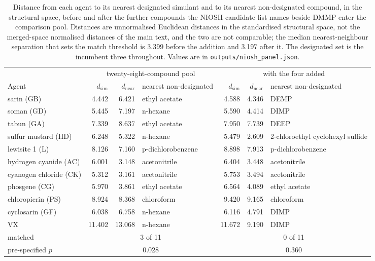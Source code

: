 \begin{table}[htb]
\centering
\caption{Distance from each agent to its nearest designated simulant and to its nearest non-designated compound, in the structural space, before and after the further compounds the NIOSH candidate list names beside DMMP enter the comparison pool. Distances are unnormalised Euclidean distances in the standardised structural space, not the merged-space normalised distances of the main text, and the two are not comparable; the median nearest-neighbour separation that sets the match threshold is 3.399 before the addition and 3.197 after it. The designated set is the incumbent three throughout. Values are in \texttt{outputs/niosh\_panel.json}.}
\label{tab:niosh}
\footnotesize
\setlength{\tabcolsep}{3pt}
\begin{tabular}{lrrlrrl}
\hline
 & \multicolumn{3}{c}{twenty-eight-compound pool} & \multicolumn{3}{c}{with the four added} \\
\cline{2-4}\cline{5-7}
Agent & $d_{\mathrm{sim}}$ & $d_{\mathrm{near}}$ & nearest non-designated & $d_{\mathrm{sim}}$ & $d_{\mathrm{near}}$ & nearest non-designated \\
\hline
sarin (GB) & 4.442 & 6.421 & ethyl acetate & 4.588 & 4.346 & DEMP \\
soman (GD) & 5.445 & 7.197 & n-hexane & 5.590 & 4.414 & DIMP \\
tabun (GA) & 7.339 & 8.637 & ethyl acetate & 7.950 & 7.739 & DEEP \\
sulfur mustard (HD) & 6.248 & 5.322 & n-hexane & 5.479 & 2.609 & 2-chloroethyl cyclohexyl sulfide \\
lewisite 1 (L) & 8.126 & 7.160 & p-dichlorobenzene & 8.898 & 7.913 & p-dichlorobenzene \\
hydrogen cyanide (AC) & 6.001 & 3.148 & acetonitrile & 6.404 & 3.448 & acetonitrile \\
cyanogen chloride (CK) & 5.312 & 3.161 & acetonitrile & 5.753 & 3.494 & acetonitrile \\
phosgene (CG) & 5.970 & 3.861 & ethyl acetate & 6.564 & 4.089 & ethyl acetate \\
chloropicrin (PS) & 8.924 & 8.368 & chloroform & 9.420 & 9.165 & chloroform \\
cyclosarin (GF) & 6.038 & 6.758 & n-hexane & 6.116 & 4.791 & DIMP \\
VX & 11.402 & 13.068 & n-hexane & 11.672 & 9.190 & DIMP \\
\hline
matched & \multicolumn{3}{c}{3 of 11} & \multicolumn{3}{c}{0 of 11} \\
pre-specified $p$ & \multicolumn{3}{c}{0.028} & \multicolumn{3}{c}{0.360} \\
\hline
\end{tabular}
\end{table}
